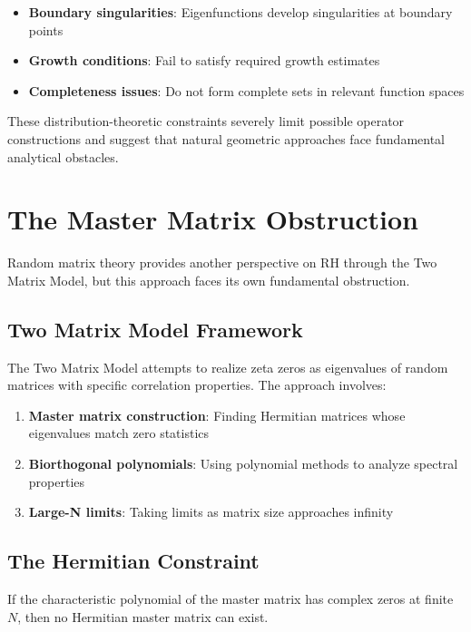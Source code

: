 \begin{itemize}
\item \textbf{Boundary singularities}: Eigenfunctions develop singularities at boundary points
\item \textbf{Growth conditions}: Fail to satisfy required growth estimates
\item \textbf{Completeness issues}: Do not form complete sets in relevant function spaces
\end{itemize}

\begin{remark}
These distribution-theoretic constraints severely limit possible operator constructions and suggest that natural geometric approaches face fundamental analytical obstacles.
\end{remark}

\section{The Master Matrix Obstruction}
\label{sec:master_matrix}

Random matrix theory provides another perspective on RH through the Two Matrix Model, but this approach faces its own fundamental obstruction.

\subsection{Two Matrix Model Framework}

The Two Matrix Model attempts to realize zeta zeros as eigenvalues of random matrices with specific correlation properties. The approach involves:

\begin{enumerate}
\item \textbf{Master matrix construction}: Finding Hermitian matrices whose eigenvalues match zero statistics
\item \textbf{Biorthogonal polynomials}: Using polynomial methods to analyze spectral properties
\item \textbf{Large-N limits}: Taking limits as matrix size approaches infinity
\end{enumerate}

\subsection{The Hermitian Constraint}

\begin{theorem}
\label{thm:master_matrix}
If the characteristic polynomial of the master matrix has complex zeros at finite $N$, then no Hermitian master matrix can exist.
\end{theorem}

